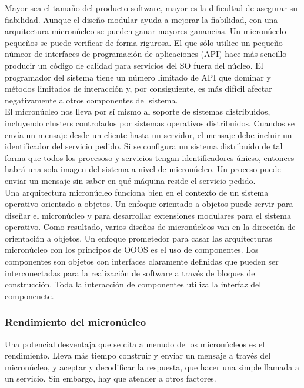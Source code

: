 \documentclass{article}
\begin{document}
				Mayor sea el tamaño del producto software, mayor es la dificultad de asegurar su fiabilidad. Aunque el diseño modular ayuda a mejorar la fiabilidad, con una arquitectura micronúcleo se pueden ganar mayores ganancias. Un micronúcelo pequeños se puede verificar de forma rigurosa. El que sólo utilice un pequeño númeor de interfaces de programación de aplicaciones (API) hace más sencillo producir un código de calidad para servicios del SO fuera del núcleo. El programador del sistema tiene un número limitado de API que dominar y métodos limitados de interacción y,  por consiguiente, es más difícil afectar negativamente a otros componentes del sistema. \\
				
				El micronúcleo nos lleva por sí mismo al soporte de sistemas distribuidos, incluyendo clusters controlados por sistemas operativos distribuidos. Cuandos se envía un mensaje desde un cliente hasta un servidor, el mensaje debe incluir un identificador del servicio pedido. Si se configura un sistema distribuido de tal forma que todos los procesoso y servicios tengan identificadores únicso, entonces habrá una sola imagen del sistema a nivel de micronúcleo. Un proceso puede enviar un mensaje sin saber en qué máquina reside el servicio pedido.  \\
				
				Una arquitectura micronúcleo funciona bien en el contexto de un sistema operativo orientado a objetos. Un enfoque orientado a objetos puede servir para diseñar el micronúcleo y para desarrollar extensiones modulares para el sistema operativo. Como resultado, varios diseños de micronúcleos van en la dirección de orientación a objetos. Un enfoque prometedor para casar las arquitecturas micronúcleo con los principos de OOOS es el uso de componentes. Los componentes son objetos con interfaces claramente definidas que pueden ser interconectadas para la realización de software a través de bloques de construcción. Toda la interacción de componentes utiliza la interfaz del componenete.
				
			\subsubsection{Rendimiento del micronúcleo}
				Una potencial desventaja que se cita a menudo de los micronúcleos es el rendimiento. Lleva más tiempo construir y enviar un mensaje a través del micronúcleo, y aceptar y decodificar la respuesta, que hacer una simple llamada a un servicio. Sin embargo, hay que atender a otros factores. \\
				
\end{document}
